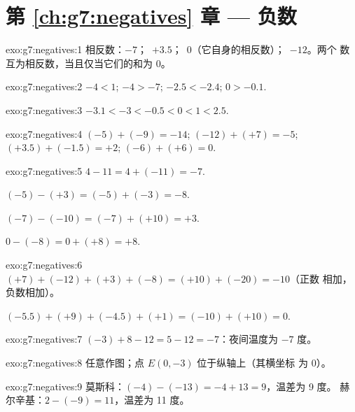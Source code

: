 \section*{第 \ref{ch:g7:negatives} 章 --- 负数}

\begin{solution}{exo:g7:negatives:1}
相反数：$-7$；\ $+3.5$；\ $0$（它自身的相反数）；\ $-12$。两个
数互为相反数，当且仅当它们的和为 $0$。
\end{solution}

\begin{solution}{exo:g7:negatives:2}
$-4 < 1$; \quad $-4 > -7$; \quad $-2.5 < -2.4$; \quad $0 > -0.1$.
\end{solution}

\begin{solution}{exo:g7:negatives:3}
$-3.1 < -3 < -0.5 < 0 < 1 < 2.5$.
\end{solution}

\begin{solution}{exo:g7:negatives:4}
$(-5) + (-9) = -14$; \quad
$(-12) + (+7) = -5$; \quad
$(+3.5) + (-1.5) = +2$; \quad
$(-6) + (+6) = 0$.
\end{solution}

\begin{solution}{exo:g7:negatives:5}
$4 - 11 = 4 + (-11) = -7$.

$(-5) - (+3) = (-5) + (-3) = -8$.

$(-7) - (-10) = (-7) + (+10) = +3$.

$0 - (-8) = 0 + (+8) = +8$.
\end{solution}

\begin{solution}{exo:g7:negatives:6}
$(+7) + (-12) + (+3) + (-8) = (+10) + (-20) = -10$（正数
相加，负数相加）。

$(-5.5) + (+9) + (-4.5) + (+1) = (-10) + (+10) = 0$.
\end{solution}

\begin{solution}{exo:g7:negatives:7}
$(-3) + 8 - 12 = 5 - 12 = -7$：夜间温度为 $-7$ 度。
\end{solution}

\begin{solution}{exo:g7:negatives:8}
任意作图；点 $E(0, -3)$ 位于纵轴上（其横坐标
为 $0$）。
\end{solution}

\begin{solution}{exo:g7:negatives:9}
莫斯科：$(-4) - (-13) = -4 + 13 = 9$，温差为 9 度。
赫尔辛基：$2 - (-9) = 11$，温差为 11 度。
\end{solution}

